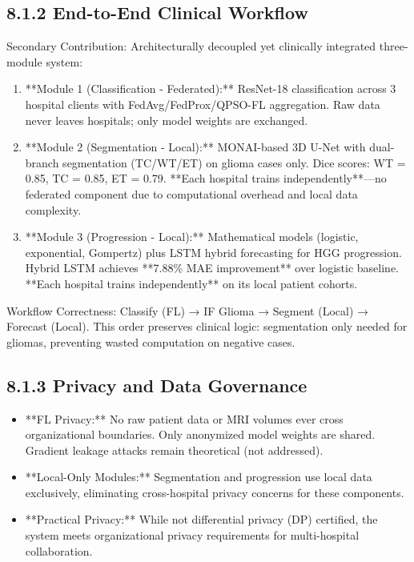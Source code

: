 \subsection{8.1.2 End-to-End Clinical Workflow}
Secondary Contribution: Architecturally decoupled yet clinically integrated three-module system:

\begin{enumerate}
  \item **Module 1 (Classification - Federated):** ResNet-18 classification across 3 hospital clients with FedAvg/FedProx/QPSO-FL aggregation. Raw data never leaves hospitals; only model weights are exchanged.
  \item **Module 2 (Segmentation - Local):** MONAI-based 3D U-Net with dual-branch segmentation (TC/WT/ET) on glioma cases only. Dice scores: WT = 0.85, TC = 0.85, ET = 0.79. **Each hospital trains independently**—no federated component due to computational overhead and local data complexity.
  \item **Module 3 (Progression - Local):** Mathematical models (logistic, exponential, Gompertz) plus LSTM hybrid forecasting for HGG progression. Hybrid LSTM achieves **7.88\% MAE improvement** over logistic baseline. **Each hospital trains independently** on its local patient cohorts.
\end{enumerate}

Workflow Correctness: Classify (FL) → IF Glioma → Segment (Local) → Forecast (Local). This order preserves clinical logic: segmentation only needed for gliomas, preventing wasted computation on negative cases.


\subsection{8.1.3 Privacy and Data Governance}
\begin{itemize}
  \item **FL Privacy:** No raw patient data or MRI volumes ever cross organizational boundaries. Only anonymized model weights are shared. Gradient leakage attacks remain theoretical (not addressed).
  \item **Local-Only Modules:** Segmentation and progression use local data exclusively, eliminating cross-hospital privacy concerns for these components.
  \item **Practical Privacy:** While not differential privacy (DP) certified, the system meets organizational privacy requirements for multi-hospital collaboration.
\end{itemize}


